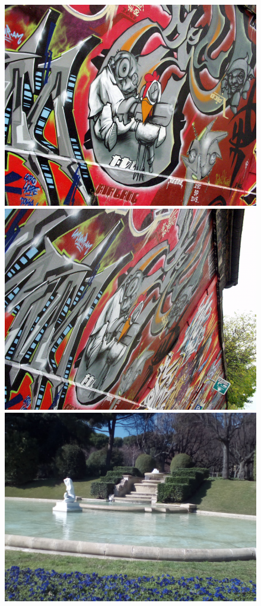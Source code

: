 		\begin{figure}[!htb]
				\includegraphics[width=\linewidth]{images/experiments/graf3}
				\label{fig:awesome_image1}
			\endminipage\hfill
				\includegraphics[width=\linewidth]{images/experiments/graf6}
				\label{fig:awesome_image2}
			\endminipage\hfill
				\includegraphics[width=\linewidth]{images/experiments/jardi1}

\end{figure}
